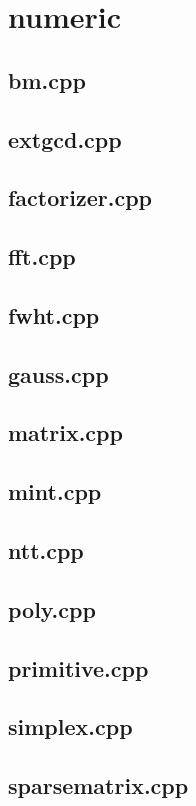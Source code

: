\section{numeric}

\subsection{bm.cpp}


\subsection{extgcd.cpp}


\subsection{factorizer.cpp}


\subsection{fft.cpp}


\subsection{fwht.cpp}


\subsection{gauss.cpp}


\subsection{matrix.cpp}


\subsection{mint.cpp}


\subsection{ntt.cpp}


\subsection{poly.cpp}


\subsection{primitive.cpp}


\subsection{simplex.cpp}


\subsection{sparsematrix.cpp}


